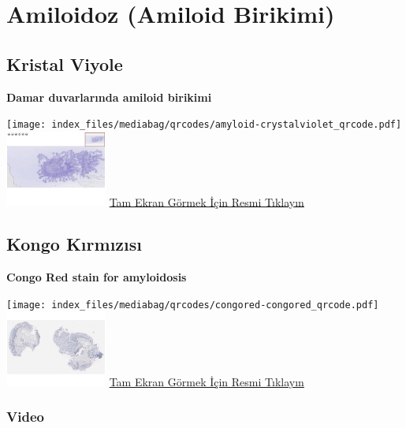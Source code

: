 \documentclass[
  letterpaper,
  DIV=11,
  numbers=noendperiod]{scrreprt}
\begin{document}
\hypertarget{sec-amiloidoz}{%
\chapter{Amiloidoz (Amiloid Birikimi)}\label{sec-amiloidoz}}

\hypertarget{sec-amiloidoz-kristal-viyole}{%
\section{Kristal Viyole}\label{sec-amiloidoz-kristal-viyole}}

\textbf{Damar duvarlarında amiloid birikimi}

\texttt{[image: index\_files/mediabag/qrcodes/amyloid-crystalviolet\_qrcode.pdf]}
\href{https://images.patolojiatlasi.com/amyloid/crystalviolet.html}{\includegraphics[width=0.25\textwidth,height=\textheight]{./screenshots/thumbnail_crystalviolet.png}}
\href{https://images.patolojiatlasi.com/amyloid/crystalviolet.html}{Tam
Ekran Görmek İçin Resmi Tıklayın}

\hypertarget{sec-amiloidoz-kongo-kirmizisi}{%
\section{Kongo Kırmızısı}\label{sec-amiloidoz-kongo-kirmizisi}}

\textbf{Congo Red stain for amyloidosis}

\texttt{[image: index\_files/mediabag/qrcodes/congored-congored\_qrcode.pdf]}
\href{https://images.patolojiatlasi.com/congored/congored.html}{\includegraphics[width=0.25\textwidth,height=\textheight]{./screenshots/thumbnail_congored.png}}
\href{https://images.patolojiatlasi.com/congored/congored.html}{Tam
Ekran Görmek İçin Resmi Tıklayın}

\hypertarget{video}{%
\subsection{Video}\label{video}}
\end{document}
